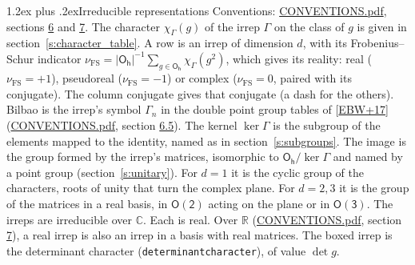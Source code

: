 \documentclass[10pt,a4paper]{article}
\makeatletter
\renewcommand\section{\@startsection{section}{1}{\z@}{-3ex plus -1ex minus -.2ex}%
  {1.2ex plus .2ex}{\normalfont\large\sffamily\bfseries\color{parttitle}}}
\numberwithin{equation}{section}
\newcommand{\grp}[1]{\mathsf{#1}}
\newcommand{\irchar}[1]{\chi_{#1}}
\newcommand{\fsind}{\nu_{\mathrm{FS}}}
\makeatother
\begin{document}
\section{Irreducible representations}\label{s:irreps}
Conventions: \href{../../CONVENTIONS.pdf}{CONVENTIONS.pdf}, sections \href{../../CONVENTIONS.pdf\#conv.6}{6} and \href{../../CONVENTIONS.pdf\#conv.7}{7}.
\leavevmode\label{n:function.character}\label{n:irrep.Gamma}The character $\irchar{\Gamma}(g)$ of the irrep $\Gamma$ on the class of $g$ is given in section~\ref{s:character_table}.
\leavevmode\label{n:index.dimension}\label{n:index.frobenius}\label{n:head.irrep}\label{n:head.reality}A row is an irrep of dimension $d$, with its Frobenius--Schur indicator $\fsind = |\grp{O_{h}}|^{-1}\allowbreak\sum_{g\in\grp{O_{h}}}\irchar{\Gamma}(g^2)$, which gives its reality: real ($\fsind = +1$), pseudoreal ($\fsind = -1$) or complex ($\fsind = 0$, paired with its conjugate). \label{n:head.conjugate}The column conjugate gives that conjugate (a dash for the others). \label{n:head.bilbao}\label{n:irrep.alias.gamma}Bilbao is the irrep's symbol $\Gamma_n$ in the double point group tables of [\href{../../../REFERENCES.pdf\#ref.EBW+17}{EBW+17}] (\href{../../CONVENTIONS.pdf}{CONVENTIONS.pdf}, section \href{../../CONVENTIONS.pdf\#conv.6.5}{6.5}). \label{n:head.kernel}The kernel $\ker\Gamma$ is the subgroup of the elements mapped to the identity, named as in section~\ref{s:subgroups}. \label{n:head.image}The image is the group formed by the irrep's matrices, isomorphic to $\grp{O_{h}}/\ker\Gamma$ and named by a point group (section~\ref{s:unitary}). For $d = 1$ it is the cyclic group of the characters, roots of unity that turn the complex plane. For $d = 2, 3$ it is the group of the matrices in a real basis, in $\grp{O(2)}$ acting on the plane or in \href{O3.pdf}{$\grp{O(3)}$}. The irreps are irreducible over $\mathbb{C}$. Each is real. Over $\mathbb{R}$ (\href{../../CONVENTIONS.pdf}{CONVENTIONS.pdf}, section \href{../../CONVENTIONS.pdf\#conv.7}{7}), a real irrep is also an irrep in a basis with real matrices. \label{n:mark.determinant}The boxed irrep is the determinant character (\texttt{determinantcharacter}), of value $\det g$.
\setlength{\emergencystretch}{2em}\par\setlength{\emergencystretch}{0pt}
\end{document}
